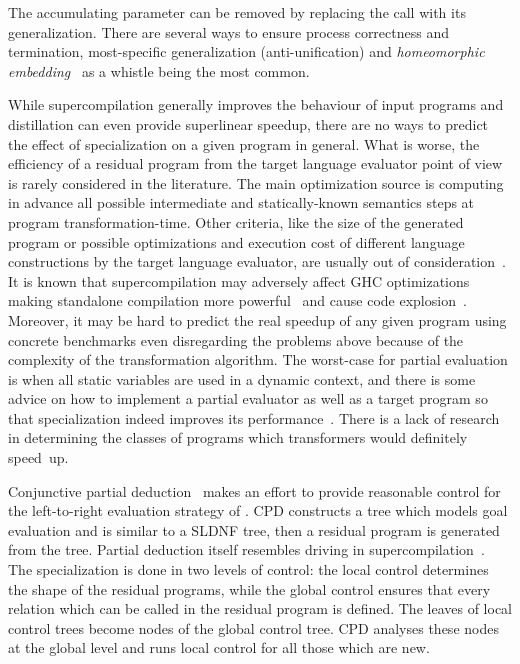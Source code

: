 The accumulating parameter can be removed by replacing the call with its generalization.
There are several ways to ensure process correctness and termination, most-specific generalization
(anti-unification) and \emph{homeomorphic embedding}~\cite{Higman52,Kruskal60} as a
whistle being the most common.

While supercompilation generally improves the behaviour of input programs and distillation can even provide superlinear speedup, there are no ways to predict the effect of specialization on a given program in general.
What is worse, the efficiency of a residual program from the target language evaluator point of view is rarely considered in the literature.
The main optimization source is computing in advance all possible intermediate and statically-known semantics steps at program transformation-time.
Other criteria, like the size of the generated program or possible optimizations and execution cost of different language constructions by the target language evaluator, are usually out of consideration~\cite{jonesbook}.
It is known that supercompilation may adversely affect GHC optimizations making standalone compilation more powerful~\cite{SCBE,TCES} and cause code explosion~\cite{SCHC}.
Moreover, it may be hard to predict the real speedup of any given program using concrete benchmarks even disregarding the problems above because of the complexity of the transformation algorithm.
The worst-case for partial evaluation is when all static variables are used in a dynamic context, and there is some advice on how to implement a partial evaluator as well as a target program so that specialization indeed improves its performance~\cite{jonesbook,bulyonkov84}.
There is a lack of research in determining the classes of programs which transformers would definitely speed~up.

Conjunctive partial deduction~\cite{de1999conjunctive} makes an effort to provide reasonable control for the left-to-right evaluation strategy of \pro.
CPD constructs a tree which models goal evaluation and is similar to a SLDNF tree, then a residual program is generated from the tree.
Partial deduction itself resembles driving in supercompilation~\cite{gluck1994partial}.
The specialization is done in two levels of control: the local control determines the shape of the residual programs, while the global control ensures that every relation which can be called in the residual program is defined.
The leaves of local control trees become nodes of the global control tree.
CPD analyses these nodes at the global level and runs local control for all those which are new.

